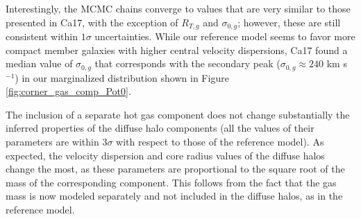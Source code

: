 \documentclass[twocolumn]{aastex61}
\begin{document}
Interestingly, the MCMC chains converge to values that are very similar to those
presented in Ca17, with the exception of $R_{T,g}$ and $\sigma_{0,g}$; however,
these are still consistent within $1\sigma$ uncertainties.
While our reference model seems to favor more compact member galaxies with
higher central velocity dispersions, Ca17 found a median value of $\sigma_{0,g}$
that corresponds with the secondary peak ($\sigma_{0,g} \approx 240$ km s$^{-1}$) in our marginalized distribution shown in Figure
\ref{fig:corner_gas_comp_Pot0}.

The inclusion of a separate hot gas component does not change substantially the
inferred properties of the diffuse halo components (all the values of their
parameters are within $3\sigma$ with respect to those of the reference model).
As expected, the velocity dispersion and core radius values of the diffuse halos change the most, as
these parameters are proportional to the square root of the mass of the
corresponding component.
This follows from the fact that the gas mass is now modeled separately and not
included in the diffuse halos, as in the reference model.
\end{document}
